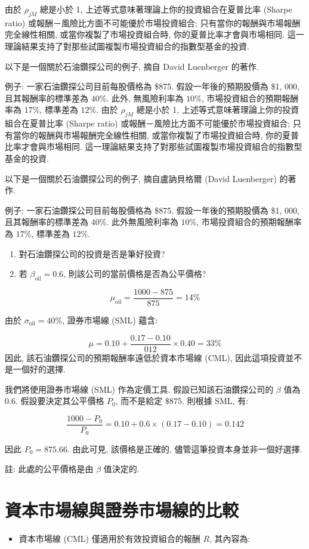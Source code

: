 \documentclass[letterpaper]{article}
\begin{document}
由於 $\rho_{j M}$ 總是小於 1, 上述等式意味著理論上你的投資組合在夏普比率 (Sharpe ratio) 或報酬－風險比方面不可能優於市場投資組合; 只有當你的報酬與市場報酬完全線性相關, 或當你複製了市場投資組合時, 你的夏普比率才會與市場相同.   
這一理論結果支持了對那些試圖複製市場投資組合的指數型基金的投資. 

以下是一個關於石油鑽探公司的例子, 摘自 David Luenberger 的著作.   

例子: 一家石油鑽探公司目前每股價格為 \$875. 假設一年後的預期股價為 \$1, 000, 且其報酬率的標準差為 $40\%$. 此外, 無風險利率為 $10\%$, 市場投資組合的預期報酬率為 $17\%$, 標準差為 $12\%$. 
由於 $\rho_{j M}$ 總是小於 1, 上述等式意味著理論上你的投資組合在夏普比率 (Sharpe ratio) 或報酬－風險比方面不可能優於市場投資組合; 只有當你的報酬與市場報酬完全線性相關, 或當你複製了市場投資組合時, 你的夏普比率才會與市場相同.   
這一理論結果支持了對那些試圖複製市場投資組合的指數型基金的投資. 

以下是一個關於石油鑽探公司的例子, 摘自盧訥貝格爾  (David Luenberger) 的著作.   

例子:  一家石油鑽探公司目前每股價格為 \$875. 假設一年後的預期股價為 \$1, 000, 且其報酬率的標準差為 $40\%$. 此外無風險利率為 $10\%$, 市場投資組合的預期報酬率為 $17\%$, 標準差為 $12\%$. 


\begin{enumerate}
	\item 對石油鑽探公司的投資是否是筆好投資? 
	\item 若 $\beta_{\text{oil}}=0.6$, 則該公司的當前價格是否為公平價格? 
\end{enumerate}

$$
\mu_{\text{oil}}=\frac{1000-875}{875}=14\%
$$

由於 $\sigma_{\text{oil}}=40\%$, 證券市場線 (SML) 蘊含: 


$$
\mu=0.10+\frac{0.17-0.10}{012} \times 0.40=33 \%
$$
因此, 該石油鑽探公司的預期報酬率遠低於資本市場線 (CML), 因此這項投資並不是一個好的選擇. 

我們將使用證券市場線 (SML) 作為定價工具. 假設已知該石油鑽探公司的 $\beta$ 值為 0.6.   
假設要決定其公平價格 $P_{0}$, 而不是給定 $\$875$.   
則根據 SML, 有: 

$$
\frac{1000-P_{0}}{P_{0}} = 0.10 + 0.6 \times  (0.17 - 0.10) = 0.142
$$

因此 $P_{0} = 875.66$.   
由此可見, 該價格是正確的, 儘管這筆投資本身並非一個好選擇. 

註: 此處的公平價格是由 $\beta$ 值決定的. 

\section{資本市場線與證券市場線的比較}
\begin{itemize}
	\item 資本市場線 (CML) 僅適用於有效投資組合的報酬 $R$, 其內容為: 
\end{itemize}
\end{document}
